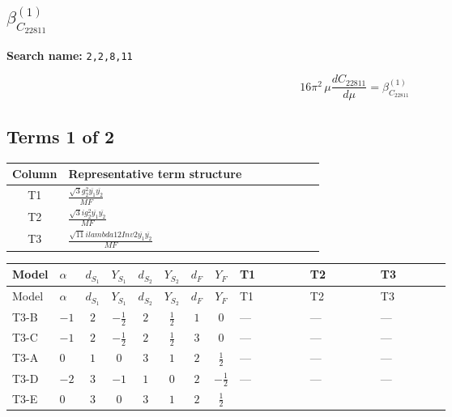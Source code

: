\documentclass[8pt]{article}
\begin{document}
\begin{landscape}
\section*{$\beta_{C_{22811}}^{(1)}$}
\noindent\textbf{Search name: }\texttt{2,2,8,11}\par\smallskip
\[16\pi^2\,\mu\frac{d C_{22811}}{d\mu}=\beta_{C_{22811}}^{(1)}\]
\subsection*{Terms 1 of 2}
\begin{center}
\begin{tabular}{@{}c >{\raggedright\arraybackslash}p{0.82\linewidth}@{}}
\toprule
Column & Representative term structure \\
\midrule
T1 & \(\displaystyle \frac{\sqrt{3} g_{2}^{2} \overline{y_{1}} \overline{y_{2}}}{MF}\) \\
\midrule
T2 & \(\displaystyle \frac{\sqrt{3} i g_{2}^{2} \overline{y_{1}} \overline{y_{2}}}{MF}\) \\
\midrule
T3 & \(\displaystyle \frac{\sqrt{11} i lambda12Inv2 \overline{y_{1}} \overline{y_{2}}}{MF}\) \\
\midrule
\bottomrule
\end{tabular}
\end{center}
\smallskip
\tiny
\begin{longtable}{@{}llcccccc >{\raggedright\arraybackslash}p{0.21\linewidth} >{\raggedright\arraybackslash}p{0.21\linewidth} >{\raggedright\arraybackslash}p{0.21\linewidth}@{}}
\toprule
Model & $\alpha$ & $d_{S_1}$ & $Y_{S_1}$ & $d_{S_2}$ & $Y_{S_2}$ & $d_F$ & $Y_F$ & T1 & T2 & T3 \\
\midrule
\endfirsthead
\toprule
Model & $\alpha$ & $d_{S_1}$ & $Y_{S_1}$ & $d_{S_2}$ & $Y_{S_2}$ & $d_F$ & $Y_F$ & T1 & T2 & T3 \\
\midrule
\endhead
T3-B & $-1$ & $2$ & $-\frac{1}{2}$ & $2$ & $\frac{1}{2}$ & $1$ & $0$ & --- & --- & --- \\
\midrule
T3-C & $-1$ & $2$ & $-\frac{1}{2}$ & $2$ & $\frac{1}{2}$ & $3$ & $0$ & --- & --- & --- \\
\midrule
T3-A & $0$ & $1$ & $0$ & $3$ & $1$ & $2$ & $\frac{1}{2}$ & --- & --- & --- \\
\midrule
T3-D & $-2$ & $3$ & $-1$ & $1$ & $0$ & $2$ & $-\frac{1}{2}$ & --- & --- & --- \\
\midrule
T3-E & $0$ & $3$ & $0$ & $3$ & $1$ & $2$ & $\frac{1}{2}$ & \scriptsize\adjustbox{max width=\linewidth}{$\begin{gathered} - \frac{\sqrt{3} g_{2}^{2} \overline{y_{1}} \overline{y_{2}}}{6 MF}\end{gathered}$} & \scriptsize\adjustbox{max width=\linewidth}{$\begin{gathered} - \frac{11 \sqrt{3} i g_{2}^{2} \overline{y_{1}} \overline{y_{2}}}{8 MF}\end{gathered}$} & \scriptsize\adjustbox{max width=\linewidth}{$\begin{gathered} - \frac{3 \sqrt{11} i lambda12Inv2 \overline{y_{1}} \overline{y_{2}}}{22 MF}\end{gathered}$} \\

\end{longtable}
\end{landscape}
\end{document}
